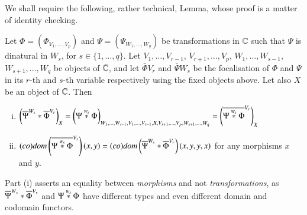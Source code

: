 We shall require the following, rather technical, Lemma, whose proof is a matter of identity checking.

\begin{lemma}\label{lemma:associativity techincal lemma}
    Let $\Phi = (\Phi_{V_1,\dots,V_p})$ and $\Psi = (\Psi_{W_1,\dots,W_q})$ be transformations in $\mathbb C$ such that $\Psi$ is dinatural in $W_s$, for $s \in \{1,\dots,q\}$. Let $V_1,\dots,V_{r-1}$, $V_{r+1},\dots,V_p$, $W_1,\dots,W_{s-1}$, $W_{s+1},\dots,W_q$ be objects of $\mathbb C$, and let $\bar \Phi {V_r}$ and $\bar \Psi {W_s}$ be the focalisation of $\Phi$ and $\Psi$ in its $r$-th and $s$-th variable respectively using the fixed objects above. Let also $X$ be an object of $\mathbb C$. Then 
    \begin{enumerate}[(i)]
        \item $ \left( \hc { \bar \Phi {V_r} } { \bar \Psi {W_s} } \right)_X = \left( \HC \Phi \Psi {W_s} \right)_{W_1,\dots,W_{s-1},V_1,\dots,V_{r-1},X,V_{r+1},\dots,V_p,W_{s+1},\dots,W_q} = \left( \bar {\HC \Phi \Psi {W_s}} {V_r} \right)_X $
        \item $\mathit{(co)dom}\left( \bar {\HC \Phi \Psi {W_s}} {V_r} \right) (x,y) = \mathit{(co)dom}\left( \hc {\bar \Phi {V_r}} {\bar \Psi {W_s}} \right) (x,y,y,x)  $ for any morphisms $x$ and $y$.
    \end{enumerate}
\end{lemma}

\begin{remark}\label{rem:associativity techincal lemma remark}
    Part (i) asserts an equality between \emph{morphisms} and not \emph{transformations}, as $ \hc { \bar \Phi {V_r} } { \bar \Psi {W_s} }$ and ${\Psi} \overset{\text{\tiny $W_s$}}{\mathbin{\ast}} {\Phi}$ have different types and even different domain and codomain functors.
\end{remark}

